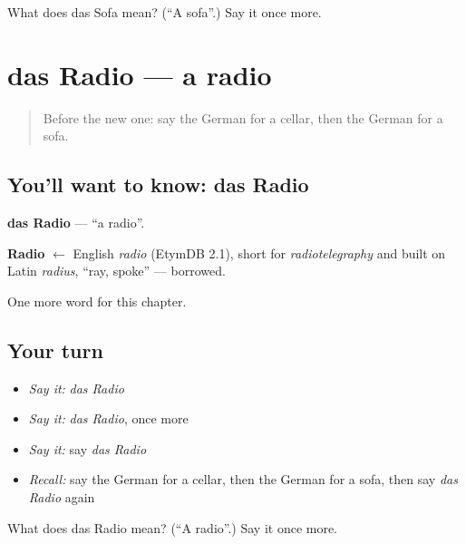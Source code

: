 \begin{tcolorbox}[breakable,colback=teal!4,colframe=teal!35!black,title={Before you move on}]
What does das Sofa mean? (\textquotedblleft{}A sofa\textquotedblright{}.) Say it once more.
\end{tcolorbox}
\section[das Radio]{das Radio — a radio}

\label{lesson:GE-C162-radio}



\begin{quote}
Before the new one: say the German for a cellar, then the German for a sofa.
\end{quote}

\subsection*{You'll want to know: das Radio}
\textbf{das Radio} — \textquotedblleft{}a radio\textquotedblright{}.

\begin{cousinweb}
\textbf{Radio} $\leftarrow$ English \emph{radio} (EtymDB 2.1), short for \emph{radiotelegraphy} and built on Latin \emph{radius}, \textquotedblleft{}ray, spoke\textquotedblright{} — borrowed.
\end{cousinweb}

\begin{grammarlens}[title={What you've built}]
One more word for this chapter.
\end{grammarlens}

\subsection*{Your turn}
\begin{itemize}
\raggedright
  \item \emph{Say it:} \emph{das Radio}
  \item \emph{Say it:} \emph{das Radio}, once more
  \item \emph{Say it:} say \emph{das Radio}
  \item \emph{Recall:} say the German for a cellar, then the German for a sofa, then say \emph{das Radio} again
\end{itemize}

\begin{tcolorbox}[breakable,colback=teal!4,colframe=teal!35!black,title={Before you move on}]
What does das Radio mean? (\textquotedblleft{}A radio\textquotedblright{}.) Say it once more.
\end{tcolorbox}
